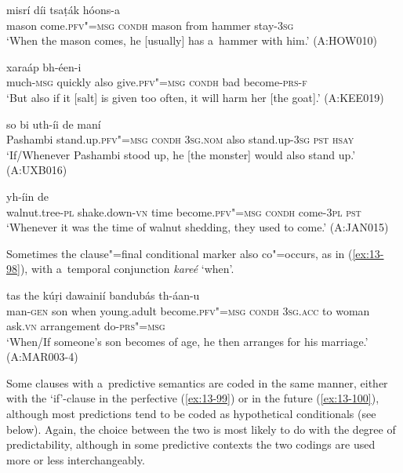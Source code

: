 \begin{exe}
\ex
\label{ex:13-94}
 misrí díi tsaṭák hóons-a \\
mason come.\textsc{pfv"=msg} \textsc{condh} mason from hammer stay-\textsc{3sg}  \\
\glt `When the mason comes, he [usually] has a~hammer with him.' (A:HOW010)

\ex
\label{ex:13-95}
 xaraáp  bh-éen-i \\
much-\textsc{msg} quickly also give.\textsc{pfv"=msg} \textsc{condh} bad  become-\textsc{prs-f}   \\
\glt `But also if it [salt] is given too often, it will harm her [the goat].' (A:KEE019)

\ex
\label{ex:13-96}
 so bi  uth-íi de maní \\
Pashambi stand.up.\textsc{pfv"=msg} \textsc{condh} \textsc{3sg.nom} also stand.up-\textsc{3sg} \textsc{pst} \textsc{hsay}  \\
\glt `If/Whenever Pashambi stood up, he [the monster] would also stand up.' (A:UXB016)

\ex
\label{ex:13-97}
\gll [ac̣húuṛi-m ṭhak"=ainií waxt bhíl-u seentá]  yh-íin de \\
walnut.tree-\textsc{pl} shake.down-\textsc{vn} time become.\textsc{pfv"=msg} \textsc{condh} come-\textsc{3pl} \textsc{ pst}    \\
\glt `Whenever it was the time of walnut shedding, they used to come.' (A:JAN015) 
\end{exe}

Sometimes the clause"=final conditional marker also co"=occurs, as in (\ref{ex:13-98}), with a~temporal conjunction \textit{kareé} `when'. 

\begin{exe}
\ex
\label{ex:13-98}
  tas the kúṛi dawainií
bandubás  th-áan-u \\
man-\textsc{gen} son when young.adult become.\textsc{pfv"=msg} \textsc{condh} \textsc{3sg.acc} to woman ask.\textsc{vn} arrangement do-\textsc{prs"=msg}  \\
\glt `When/If someone's son becomes of age, he then arranges for his marriage.' (A:MAR003-4) 
\end{exe}

Some clauses with a~predictive semantics are coded in the same manner, either with the `if'-clause in the perfective (\ref{ex:13-99}) or in the future (\ref{ex:13-100}), although most predictions tend to be coded as hypothetical conditionals (see below). Again, the choice between the two is most likely to do with the degree of predictability, although in some predictive contexts the two codings are used more or less interchangeably.

